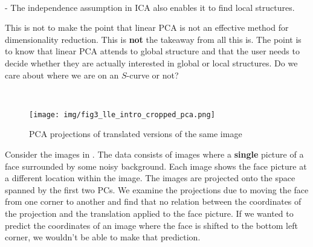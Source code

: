 \\

- The independence assumption in ICA also enables it to find local structures.

This is not to make the point that linear PCA is not an effective method for dimensionality reduction. This is \textbf{not} the takeaway from all this is. The point is to know that linear PCA attends to global structure and that the user needs to decide whether they are actually interested in global or local structures. Do we care about where we are on an $S$-curve or not?


\begin{frame}
\\


\begin{figure}[ht]
	\centering
	\texttt{[image: img/fig3\_lle\_intro\_cropped\_pca.png]}
	\caption{PCA projections of translated versions of the same image}
	\label{fig:faces_translated_pca}
\end{figure}


\end{frame}


Consider the images in . The data consists of images where a \textbf{single} picture of a face surrounded by some noisy background. Each image shows the face picture at a different location within the image. The images are projected onto the space spanned by the first two PCs. We examine the projections due to moving the face from one corner to another and find that no relation between the coordinates of the projection and the translation applied to the face picture. If we wanted to predict the coordinates of an image where the face is shifted to the bottom left corner, we wouldn't be able to make that prediction.

